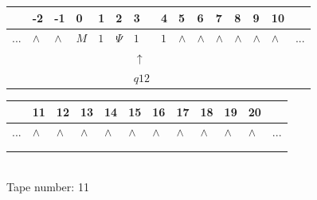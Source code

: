 \documentclass[11pt]{article}
\begin{document}
\begin{table}[H]
\centering
\begin{tabular}{lllllllllllllll}
 & -2 & -1 & 0 & 1 & 2 & 3 & 4 & 5 & 6 & 7 & 8 & 9 & 10 & \\
\hline
$...$ & \multicolumn{1}{|l|}{$\wedge$} & \multicolumn{1}{|l|}{$\wedge$} & \multicolumn{1}{|l|}{$M$} & \multicolumn{1}{|l|}{$1$} & \multicolumn{1}{|l|}{$\Psi$} & \multicolumn{1}{|l|}{$1$} & \multicolumn{1}{|l|}{$1$} & \multicolumn{1}{|l|}{$\wedge$} & \multicolumn{1}{|l|}{$\wedge$} & \multicolumn{1}{|l|}{$\wedge$} & \multicolumn{1}{|l|}{$\wedge$} & \multicolumn{1}{|l|}{$\wedge$} & \multicolumn{1}{|l|}{$\wedge$} & $...$\\
\hline
&  &  &  &  &  & $\uparrow$ &  &  &  &  &  &  &  &  \\
&  &  &  &  &  & $ q12 $ &  &  &  &  &  &  &  &  \\
\end{tabular}
\begin{tabular}{llllllllllll}
 & 11 & 12 & 13 & 14 & 15 & 16 & 17 & 18 & 19 & 20 & \\
\hline
$...$ & \multicolumn{1}{|l|}{$\wedge$} & \multicolumn{1}{|l|}{$\wedge$} & \multicolumn{1}{|l|}{$\wedge$} & \multicolumn{1}{|l|}{$\wedge$} & \multicolumn{1}{|l|}{$\wedge$} & \multicolumn{1}{|l|}{$\wedge$} & \multicolumn{1}{|l|}{$\wedge$} & \multicolumn{1}{|l|}{$\wedge$} & \multicolumn{1}{|l|}{$\wedge$} & \multicolumn{1}{|l|}{$\wedge$} & $...$\\
\hline
&  &  &  &  &  &  &  &  &  &  &  \\
&  &  &  &  &  &  &  &  &  &  &  \\
\end{tabular}
\\
Tape number: 11
\noindent\makebox[\linewidth]{\hdashrule{\textwidth}{1pt}{1pt}}\end{table}
\clearpage
\end{document}
